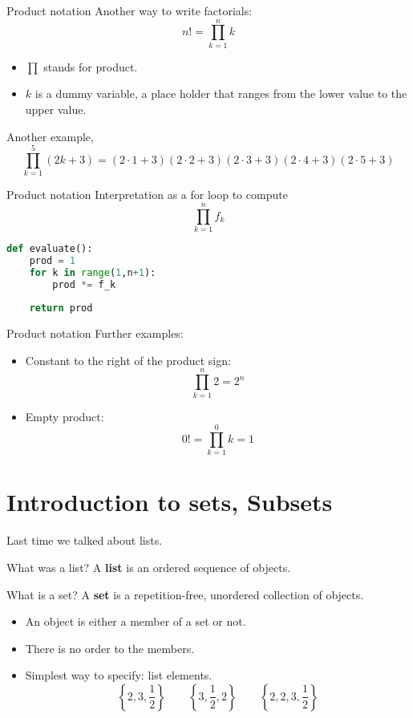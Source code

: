 \documentclass{beamer}
\begin{document}
\begin{frame}{Product notation}
Another way to write factorials:
\[
n!=\prod_{k=1}^nk
\]
\begin{itemize}
\item $\prod$ stands for product.
\item $k$ is a dummy variable, a place holder that ranges from the lower value to the upper value.
\end{itemize}\pause
Another example,
\[
\prod_{k=1}^5(2k+3)=(2\cdot 1+3)(2\cdot 2+3)(2\cdot 3 +3)(2\cdot 4 +3)(2\cdot 5+3)
\]
\end{frame}

\begin{frame}[fragile]{Product notation}
Interpretation as a for loop to compute
\[
\prod_{k=1}^{n}f_k
\]

\begin{lstlisting}[language=Python]
def evaluate():
    prod = 1
    for k in range(1,n+1):
        prod *= f_k
    
    return prod
\end{lstlisting}
	

\end{frame}

\begin{frame}{Product notation}
Further examples:
\begin{itemize}
\item Constant to the right of the product sign:
\[
\prod_{k=1}^n 2=2^n
\]\pause
\item Empty product:
\[
0!=\prod_{k=1}^0 k=1
\]
\end{itemize}
\end{frame}

\section{Introduction to sets, Subsets}

\begin{frame}
Last time we talked about lists.
\begin{block}{What was a list?}
A \textbf{list} is an ordered sequence of objects.
\end{block}\pause
\begin{block}{What is a set?}
A \textbf{set} is a repetition-free, unordered collection of objects.
\end{block}\pause
\begin{itemize}
\item An object is either a member of a set or not.\pause
\item There is no order to the members.\pause
\item Simplest way to specify: list elements.
\[
\left\{2,3,\frac{1}{2}\right\}\qquad\left\{3,\frac{1}{2},2\right\}\qquad\left\{2,2,3,\frac{1}{2}\right\}
\]\pause
{}
\end{itemize}
\end{frame}
\end{document}
